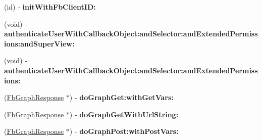 \begin{DoxyCompactItemize}
\item 
\hypertarget{interface_fb_graph_afd510d4c2b40e9c3057829c3a44d46dc}{
(id) -\/ {\bfseries init\-With\-Fb\-Client\-I\-D\-:}}
\label{interface_fb_graph_afd510d4c2b40e9c3057829c3a44d46dc}

\item 
\hypertarget{interface_fb_graph_a1bc31d022ed142e48addf23d40119a02}{
(void) -\/ {\bfseries authenticate\-User\-With\-Callback\-Object\-:and\-Selector\-:and\-Extended\-Permissions\-:and\-Super\-View\-:}}
\label{interface_fb_graph_a1bc31d022ed142e48addf23d40119a02}

\item 
\hypertarget{interface_fb_graph_af67e03ac3dfd34b8cb954cfcf633595a}{
(void) -\/ {\bfseries authenticate\-User\-With\-Callback\-Object\-:and\-Selector\-:and\-Extended\-Permissions\-:}}
\label{interface_fb_graph_af67e03ac3dfd34b8cb954cfcf633595a}

\item 
\hypertarget{interface_fb_graph_aa17e4cf632e883ccce808d0afce0f396}{
(\hyperlink{interface_fb_graph_response}{\-Fb\-Graph\-Response} $\ast$) -\/ {\bfseries do\-Graph\-Get\-:with\-Get\-Vars\-:}}
\label{interface_fb_graph_aa17e4cf632e883ccce808d0afce0f396}

\item 
\hypertarget{interface_fb_graph_ab40685f4804b7cf54eead42829ba406e}{
(\hyperlink{interface_fb_graph_response}{\-Fb\-Graph\-Response} $\ast$) -\/ {\bfseries do\-Graph\-Get\-With\-Url\-String\-:}}
\label{interface_fb_graph_ab40685f4804b7cf54eead42829ba406e}

\item 
\hypertarget{interface_fb_graph_a2a8d5f375485e446458fba832fe03c81}{
(\hyperlink{interface_fb_graph_response}{\-Fb\-Graph\-Response} $\ast$) -\/ {\bfseries do\-Graph\-Post\-:with\-Post\-Vars\-:}}
\label{interface_fb_graph_a2a8d5f375485e446458fba832fe03c81}

\end{DoxyCompactItemize}
